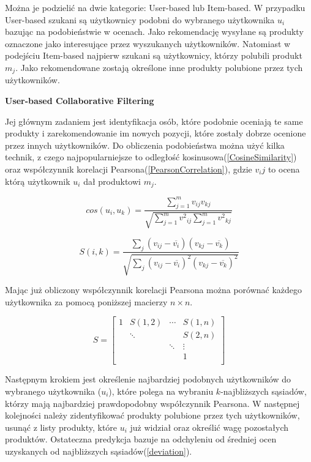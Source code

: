 Można je podzielić na dwie kategorie: User-based lub Item-based. W przypadku User-based szukani są użytkownicy podobni do wybranego użytkownika $u_i$ bazując na podobieństwie w ocenach. Jako rekomendację wysyłane są produkty oznaczone jako interesujące przez wyszukanych użytkowników. Natomiast w podejściu Item-based najpierw szukani są użytkownicy, którzy polubili produkt $m_j$. Jako rekomendowane zostają określone inne produkty polubione przez tych użytkowników.
\newline
\newline


\textbf{User-based Collaborative Filtering}

Jej głównym zadaniem jest identyfikacja osób, które podobnie oceniają te same produkty i zarekomendowanie im nowych pozycji, które zostały dobrze ocenione przez innych użytkowników. Do obliczenia podobieństwa można użyć kilka technik, z czego najpopularniejsze to odległość kosinusowa(\ref{CosineSimilarity}) oraz współczynnik korelacji Pearsona(\ref{PearsonCorrelation}), gdzie $v_ij$ to ocena którą użytkownik $u_i$ dał produktowi $m_j$.

\begin{equation}
\label{CosineSimilarity}
cos(u_i,u_k) = \frac{
\sum_{j=1}^{m} v_{ij}v_{kj}
}{
\sqrt{
\sum_{j=1}^{m}{v^2}_{ij} \sum_{j=1}^{m}{v^2}_{kj} 
}
}
\end{equation}

\begin{equation}
\label{PearsonCorrelation}
S(i,k) = \frac{
	\sum_{j} (v_{ij} - \overline{v_i}) (v_{kj} - \overline{v_k})
}{
	\sqrt{
		\sum_{j} (v_{ij} - \overline{v_i})^2 (v_{kj} - \overline{v_k})^2
	}
}
\end{equation}

Mając już obliczony współczynnik korelacji Pearsona można porównać każdego użytkownika za pomocą poniższej macierzy $n \times n$.

$$
S= \left[
\begin{array}{cccc}
1 & S(1,2) & \cdots & S(1,n) \\
 &  \ddots &   &  S(2,n) \\
 &   & \ddots  &  \vdots \\
 &   &   & 1  \\

\end{array}
\right]
$$

Następnym krokiem jest określenie najbardziej podobnych użytkowników do wybranego użytkownika ($u_i$), które polega na wybraniu $k$-najbliższych sąsiadów, którzy mają najbardziej prawdopodobny współczynnik Pearsona. W następnej kolejności należy zidentyfikować produkty polubione przez tych użytkowników, usunąć z listy produkty, które $u_i$ już widział oraz określić wagę pozostałych produktów. Ostateczna predykcja bazuje na odchyleniu od średniej ocen uzyskanych od najbliższych sąsiadów(\ref{deviation}).


